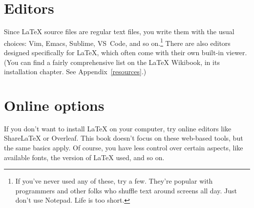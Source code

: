 \section{Editors}

Since \LaTeX{} source files are regular text files,
you write them with the usual choices: Vim, Emacs,
Sublime, VS~Code, and so on.\punckern\footnote{If you've never used
any of these, try a few.
They're popular with programmers and other folks who shuffle text around
screens all day. Just don't use Notepad. Life is too short.}
There are also editors designed specifically for \LaTeX{},
which often come with their own built-in  viewer.
(You can find a fairly comprehensive list on the \LaTeX{} Wikibook,
in its installation chapter. See Appendix~\ref{resources}.)

\section{Online options}

If you don't want to install \LaTeX{} on your computer,
try online editors like Share\LaTeX{} or Overleaf.
This book doesn't focus on these web-based tools,
but the same basics apply.
Of course, you have less control over certain aspects,
like available fonts, the version of \LaTeX{} used, and so on.
